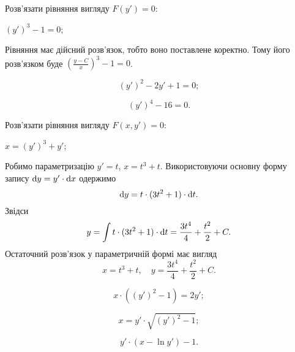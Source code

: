 Розв’язати рівняння вигляду $F(y') = 0$:
\begin{example}
	$(y')^3 - 1 = 0$;
\end{example}
\begin{solution}
	Рівняння має дійсний розв’язок, тобто воно поставлене коректно. Тому його розв’язком буде $\left(\frac{y - C}{x}\right)^3 - 1 = 0$.	
\end{solution}
\begin{multicols}{2}
\begin{problem}
	\[(y')^2 - 2 y' + 1 = 0;\]
\end{problem}
\begin{problem}
	\[ (y')^4 - 16 = 0. \]
\end{problem}
\end{multicols}

Розв’язати рівняння вигляду $F(x, y') = 0$:
\begin{example}
	$x = (y')^3 + y'$;
\end{example}
\begin{solution}
	Робимо параметризацію $y' = t$, $x = t^3 + t$. Використовуючи основну форму запису $\mathop{}\!\mathrm{d} y = y' \cdot \mathop{}\!\mathrm{d} x$ одержимо \[ \mathop{}\!\mathrm{d} y = t \cdot (3t^2 + 1) \cdot \mathop{}\!\mathrm{d} t.\]
	Звідси  \[ y = \int t \cdot (3t^2 + 1) \cdot \mathop{}\!\mathrm{d} t = \frac{3t^4}{4} + \frac{t^2}{2} + C.\]
	Остаточний розв’язок у параметричній формі має вигляд\[ x = t^3 + t, \quad y = \frac{3t^4}{4} + \frac{t^2}{2} + C.\]
\end{solution}
\begin{multicols}{2}
\begin{problem}
	\[ x \cdot ((y')^2 - 1) = 2y'; \]
\end{problem}
\begin{problem}
	\[ x = y' \cdot \sqrt{(y')^2 - 1}; \]
\end{problem}
\begin{problem}
 	\[ y' \cdot (x - \ln y') - 1. \]
\end{problem}
\end{multicols}

